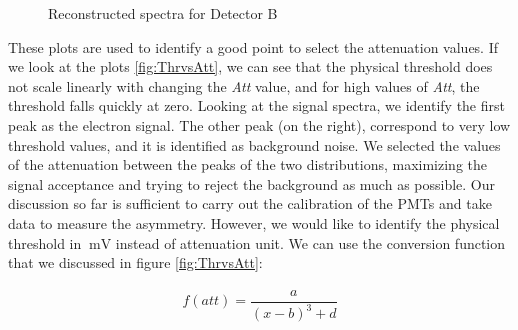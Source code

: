 \begin{figure}[hbtp]
\caption{Reconstructed spectra for Detector B}
\label{fig:Spectra}
\end{figure}

These plots are used to identify a good point to select the attenuation values. If we look at the plots \ref{fig:ThrvsAtt}, we can see that the physical threshold does not scale linearly with changing the \textit{Att} value, and for high values of \textit{Att}, the threshold falls quickly at zero. Looking at the signal spectra, we identify the first peak as the electron signal. The other peak (on the right), correspond to very low threshold values, and it is identified as background noise. 
We selected the values of the attenuation between the peaks of the two distributions, maximizing the signal acceptance and trying to reject the background as much as possible.
Our discussion so far is sufficient to carry out the calibration of the PMTs and take data to measure the asymmetry. However, we would like to identify the physical threshold in $\SI{}{\milli \volt}$ instead of attenuation unit. We can use the conversion function that we discussed in figure \ref{fig:ThrvsAtt}:

\begin{align*}
f(att) = \dfrac{a}{(x - b)^{3} + d}
\end{align*} 

